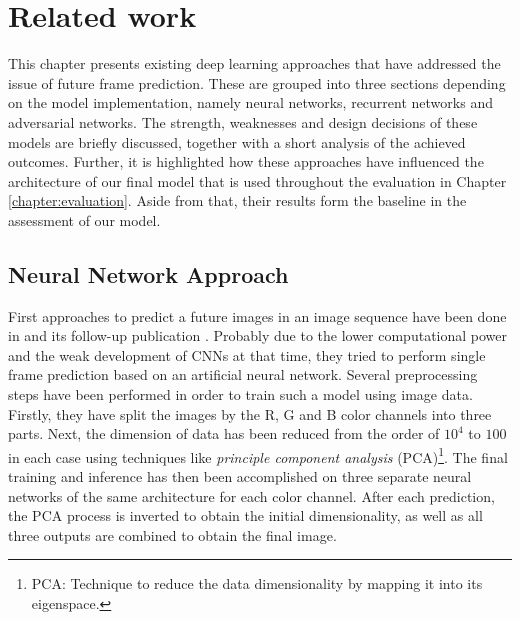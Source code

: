 
\chapter{Related work}  \label{chapter:relatedwork}

This chapter presents existing deep learning approaches that have addressed the issue of future frame prediction. These are grouped into three sections depending on the model implementation, namely neural networks, recurrent networks and adversarial networks. The strength, weaknesses and design decisions of these models are briefly discussed, together with a short analysis of the achieved outcomes. Further, it is highlighted how these approaches have influenced the architecture of our final model that is used throughout the evaluation in Chapter \ref{chapter:evaluation}. Aside from that, their results form the baseline in the assessment of our model.


\section{Neural Network Approach}

First approaches to predict a future images in an image sequence have been done in \parencite{ann} and its follow-up publication \parencite{ann2}. Probably due to the lower computational power and the weak development of CNNs at that time, they tried to perform single frame prediction based on an artificial neural network. Several preprocessing steps have been performed in order to train such a model using image data. Firstly, they have split the images by the R, G and B color channels into three parts. Next, the dimension of data has been reduced from the order of $10^4$ to $100$ in each case using techniques like \textit{principle component analysis} (PCA)\footnote{PCA: Technique to reduce the data dimensionality by mapping it into its eigenspace.}. The final training and inference has then been accomplished on three separate neural networks of the same architecture for each color channel. After each prediction, the PCA process is inverted to obtain the initial dimensionality, as well as all three outputs are combined to obtain the final image.

